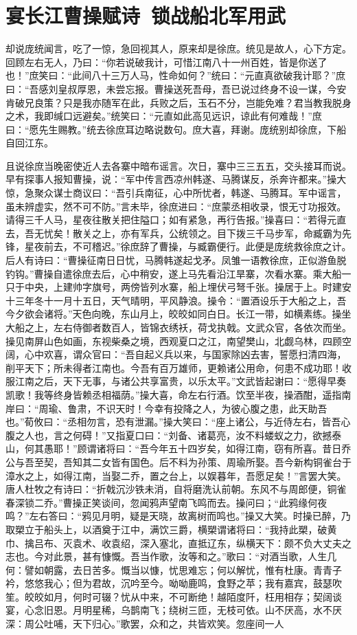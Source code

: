 \chapter{宴长江曹操赋诗~锁战船北军用武}

却说庞统闻言，吃了一惊，急回视其人，原来却是徐庶。统见是故人，心下方定。回顾左右无人，乃曰：“你若说破我计，可惜江南八十一州百姓，皆是你送了也！”庶笑曰：“此间八十三万人马，性命如何？”统曰：“元直真欲破我计耶？”庶曰：“吾感刘皇叔厚恩，未尝忘报。曹操送死吾母，吾已说过终身不设一谋，今安肯破兄良策？只是我亦随军在此，兵败之后，玉石不分，岂能免难？君当教我脱身之术，我即缄口远避矣。”统笑曰：“元直如此高见远识，谅此有何难哉！”庶曰：“愿先生赐教。”统去徐庶耳边略说数句。庶大喜，拜谢。庞统别却徐庶，下船自回江东。

且说徐庶当晚密使近人去各寨中暗布谣言。次日，寨中三三五五，交头接耳而说。早有探事人报知曹操，说：“军中传言西凉州韩遂、马腾谋反，杀奔许都来。”操大惊，急聚众谋士商议曰：“吾引兵南征，心中所忧者，韩遂、马腾耳。军中谣言，虽未辨虚实，然不可不防。”言未毕，徐庶进曰：“庶蒙丞相收录，恨无寸功报效。请得三千人马，星夜往散关把住隘口；如有紧急，再行告报。”操喜曰：“若得元直去，吾无忧矣！散关之上，亦有军兵，公统领之。目下拨三千马步军，命臧霸为先锋，星夜前去，不可稽迟。”徐庶辞了曹操，与臧霸便行。此便是庞统救徐庶之计。后人有诗曰：“曹操征南日日忧，马腾韩遂起戈矛。凤雏一语教徐庶，正似游鱼脱钓钩。”曹操自遣徐庶去后，心中稍安，遂上马先看沿江旱寨，次看水寨。乘大船一只于中央，上建帅字旗号，两傍皆列水寨，船上埋伏弓弩千张。操居于上。时建安十三年冬十一月十五日，天气晴明，平风静浪。操令：“置酒设乐于大船之上，吾今夕欲会诸将。”天色向晚，东山月上，皎皎如同白日。长江一带，如横素练。操坐大船之上，左右侍御者数百人，皆锦衣绣袄，荷戈执戟。文武众官，各依次而坐。操见南屏山色如画，东视柴桑之境，西观夏口之江，南望樊山，北觑乌林，四顾空阔，心中欢喜，谓众官曰：“吾自起义兵以来，与国家除凶去害，誓愿扫清四海，削平天下；所未得者江南也。今吾有百万雄师，更赖诸公用命，何患不成功耶！收服江南之后，天下无事，与诸公共享富贵，以乐太平。”文武皆起谢曰：“愿得早奏凯歌！我等终身皆赖丞相福荫。”操大喜，命左右行酒。饮至半夜，操酒酣，遥指南岸曰：“周瑜、鲁肃，不识天时！今幸有投降之人，为彼心腹之患，此天助吾也。”荀攸曰：“丞相勿言，恐有泄漏。”操大笑曰：“座上诸公，与近侍左右，皆吾心腹之人也，言之何碍！”又指夏口曰：“刘备、诸葛亮，汝不料蝼蚁之力，欲撼泰山，何其愚耶！”顾谓诸将曰：“吾今年五十四岁矣，如得江南，窃有所喜。昔日乔公与吾至契，吾知其二女皆有国色。后不料为孙策、周瑜所娶。吾今新构铜雀台于漳水之上，如得江南，当娶二乔，置之台上，以娱暮年，吾愿足矣！”言罢大笑。唐人杜牧之有诗曰：“折戟沉沙铁未消，自将磨洗认前朝。东风不与周郎便，铜雀春深锁二乔。”曹操正笑谈间，忽闻鸦声望南飞鸣而去。操问曰；“此鸦缘何夜鸣？”左右答曰：“鸦见月明，疑是天晓，故离树而鸣也。”操又大笑。时操已醉，乃取槊立于船头上，以酒奠于江中，满饮三爵，横槊谓诸将曰：“我持此槊，破黄巾、擒吕布、灭袁术、收袁绍，深入塞北，直抵辽东，纵横天下：颇不负大丈夫之志也。今对此景，甚有慷慨。吾当作歌，汝等和之。”歌曰：“对酒当歌，人生几何：譬如朝露，去日苦多。慨当以慷，忧思难忘；何以解忧，惟有杜康。青青子衿，悠悠我心；但为君故，沉吟至今。呦呦鹿鸣，食野之苹；我有嘉宾，鼓瑟吹笙。皎皎如月，何时可辍？忧从中来，不可断绝！越陌度阡，枉用相存；契阔谈宴，心念旧恩。月明星稀，乌鹊南飞；绕树三匝，无枝可依。山不厌高，水不厌深：周公吐哺，天下归心。”歌罢，众和之，共皆欢笑。忽座间一人